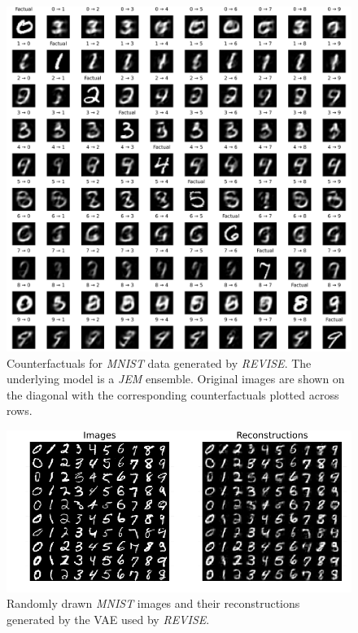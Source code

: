\begin{figure}
  \centering
  \includegraphics[width=1.0\linewidth]{../www/mnist_all_jem_ens_revise.png}
  \caption{Counterfactuals for \textit{MNIST} data generated by \textit{REVISE}. The underlying model is a \textit{JEM} ensemble. Original images are shown on the diagonal with the corresponding counterfactuals plotted across rows.}\label{fig:mnist-revise-jem-ens}
\end{figure}

\begin{figure}[h]
  \centering
  \includegraphics[width=1.0\linewidth]{../www/vae_rec.png}
  \caption{Randomly drawn \textit{MNIST} images and their reconstructions generated by the VAE used by \textit{REVISE}.}\label{fig:vae-rec}
\end{figure}

